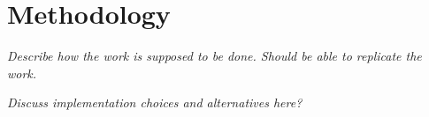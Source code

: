 \chapter{Methodology}\label{cha:method}

\textit{Describe how the work is supposed to be done. Should be able to replicate the work.}

\textit{Discuss implementation choices and alternatives here?}






